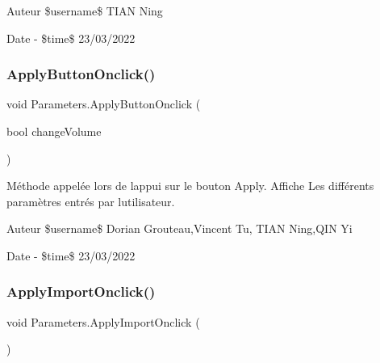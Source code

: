 \begin{DoxyAuthor}{Auteur}
\$username\$ T\+I\+AN Ning 
\end{DoxyAuthor}
\begin{DoxyDate}{Date}
-\/ \$time\$ 23/03/2022 
\end{DoxyDate}
\mbox{\label{class_parameters_a8702daf046aa4d1c44a284c78f6ff058}} 
\subsubsection{\texorpdfstring{Apply\+Button\+Onclick()}{ApplyButtonOnclick()}}
{\footnotesize\ttfamily void Parameters.\+Apply\+Button\+Onclick (\begin{DoxyParamCaption}\item[{bool}]{change\+Volume }\end{DoxyParamCaption})\hspace{0.3cm}{\ttfamily [inline]}}



Méthode appelée lors de l\textquotesingle{}appui sur le bouton Apply. Affiche Les différents paramètres entrés par l\textquotesingle{}utilisateur. 

\begin{DoxyAuthor}{Auteur}
\$username\$ Dorian Grouteau,Vincent Tu, T\+I\+AN Ning,Q\+IN Yi 
\end{DoxyAuthor}
\begin{DoxyDate}{Date}
-\/ \$time\$ 23/03/2022 
\end{DoxyDate}
\mbox{\label{class_parameters_a8438e2686a572fc6d1cc2947489da01d}} 
\subsubsection{\texorpdfstring{Apply\+Import\+Onclick()}{ApplyImportOnclick()}}
{\footnotesize\ttfamily void Parameters.\+Apply\+Import\+Onclick (\begin{DoxyParamCaption}{ }\end{DoxyParamCaption})\hspace{0.3cm}{\ttfamily [inline]}}

